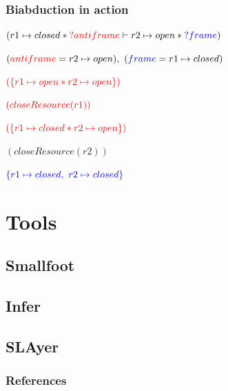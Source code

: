 \documentclass[professionalfont]{beamer}
\begin{document}
    \begin{frame}
        \frametitle{Biabduction in action}
        $(r1\mapsto closed \ast \textcolor{red}{?antiframe} \vdash r2 \mapsto open \ast \textcolor{blue}{?frame})$
        \small

        \bigskip
        \pause
        $(\textcolor{red}{antiframe} = r2 \mapsto open),\ (\textcolor{blue}{frame}=r1 \mapsto closed)$

        \bigskip
        \pause
        
        $\textcolor{red}{(\{r1 \mapsto open \ast r2 \mapsto open\})}$
        
        $\textcolor{red}{(closeResource(r1))}$
        
        $\textcolor{red}{(\{r1 \mapsto closed \ast r2 \mapsto open\})}$
        
        $(closeResource(r2))$

        $\textcolor{blue}{\{r1 \mapsto closed,\ r2 \mapsto closed\}}$

    \end{frame}
    \section{Tools}
    \subsection{Smallfoot}
    \subsection{Infer}
    \subsection{SLAyer}
    \begin{frame}[allowframebreaks]
     
        \nocite{*}
        \frametitle{References}
        
        
    \end{frame}
\end{document}
